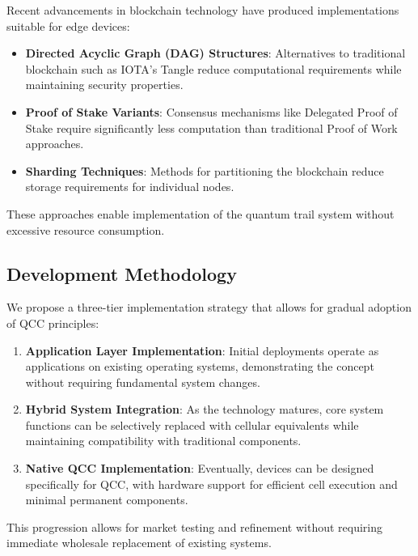 \documentclass[11pt,a4paper]{article}
\begin{document}
Recent advancements in blockchain technology have produced implementations suitable for edge devices:

\begin{itemize}
    \item \textbf{Directed Acyclic Graph (DAG) Structures}: Alternatives to traditional blockchain such as IOTA's Tangle \cite{iota} reduce computational requirements while maintaining security properties.
    
    \item \textbf{Proof of Stake Variants}: Consensus mechanisms like Delegated Proof of Stake \cite{dpos} require significantly less computation than traditional Proof of Work approaches.
    
    \item \textbf{Sharding Techniques}: Methods for partitioning the blockchain \cite{sharding} reduce storage requirements for individual nodes.
\end{itemize}

These approaches enable implementation of the quantum trail system without excessive resource consumption.

\subsection{Development Methodology}

We propose a three-tier implementation strategy that allows for gradual adoption of QCC principles:

\begin{enumerate}
    \item \textbf{Application Layer Implementation}: Initial deployments operate as applications on existing operating systems, demonstrating the concept without requiring fundamental system changes.
    
    \item \textbf{Hybrid System Integration}: As the technology matures, core system functions can be selectively replaced with cellular equivalents while maintaining compatibility with traditional components.
    
    \item \textbf{Native QCC Implementation}: Eventually, devices can be designed specifically for QCC, with hardware support for efficient cell execution and minimal permanent components.
\end{enumerate}

This progression allows for market testing and refinement without requiring immediate wholesale replacement of existing systems.
\end{document}
